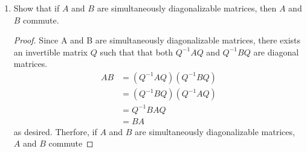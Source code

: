 \documentclass[11pt]{scrartcl}
\begin{document}
\begin{enumerate}[label=\alph*.]
{	      then $T$ and $U$ commute (i.e., $TU = UT$).
	      \begin{proof}
		      Since $T$ and $U$ are simultaneously diagonalizable operators,
		      there exists an ordered basis $\gamma$ such that $[T]_\gamma$ and $[U]_\gamma$ are diagonal matrices.
		      Notice that
		      \[[T]_\gamma [U]_\gamma = [U]_\gamma [T]_\gamma\]
		      because diagonal matrices commute.
		      This directly implies that $T$ and $U$ commute.
	      \end{proof}
	      }
	\item{
	      Show that if $A$ and $B$ are simultaneously diagonalizable matrices, then $A$ and $B$ commute.
	      \begin{proof}
		      Since A and B are simultaneously diagonalizable matrices, there exists
		      an invertible matrix $Q$ such that that both $Q^{-1}AQ$ and $Q^{-1}BQ$
		      are diagonal matrices.
		      \begin{align*}
			      AB & = (Q^{-1}AQ) (Q^{-1}BQ) \\
			         & = (Q^{-1}BQ) (Q^{-1}AQ) \\
			         & = Q^{-1} BA Q           \\
			         & = BA
		      \end{align*}
		      as desired. Therfore, if $A$ and $B$ are simultaneously diagonalizable matrices, $A$ and $B$ commute
	      \end{proof}
	      }
\end{enumerate}

\end{document}
